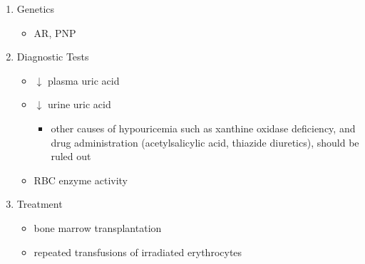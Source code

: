 \documentclass{scrartcl}
\begin{document}
\begin{enumerate}
\item Genetics
\label{sec:orgf763f7f}
\begin{itemize}
\item AR, PNP
\end{itemize}

\item Diagnostic Tests
\label{sec:org43ca97f}
\begin{itemize}
\item \(\downarrow\) plasma uric acid
\item \(\downarrow\) urine uric acid
\begin{itemize}
\item other causes of hypouricemia such as xanthine oxidase deficiency,
and drug administration (acetylsalicylic acid, thiazide diuretics),
should be ruled out
\end{itemize}
\item RBC enzyme activity
\end{itemize}

\item Treatment
\label{sec:org44b585e}
\begin{itemize}
\item bone marrow transplantation
\item repeated transfusions of irradiated erythrocytes
\end{itemize}
\end{enumerate}
\end{document}
